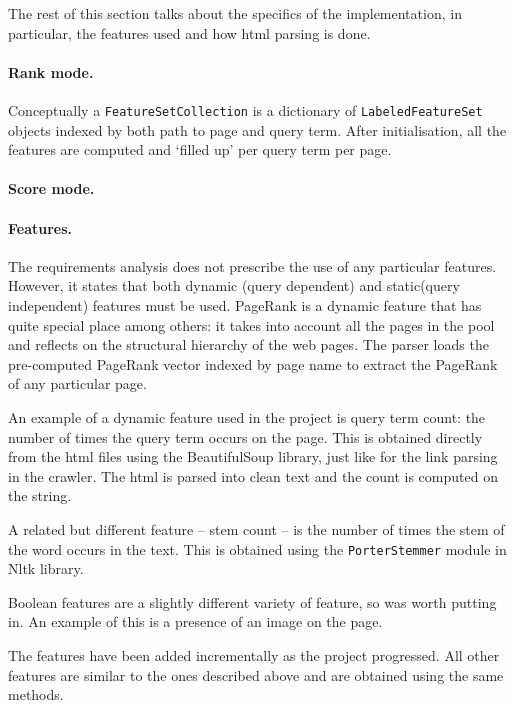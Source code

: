 \documentclass[11pt,twoside,notitlepage]{report}
\begin{document}
The rest of this section talks about the specifics of the implementation, in
particular, the features used and how html parsing is done.

\paragraph{Rank mode.}
Conceptually a \texttt{FeatureSetCollection} is a dictionary of \texttt{LabeledFeatureSet}
objects indexed by both path to page and  query term. After initialisation, all
the features are computed and `filled up' per query term per page.

\paragraph{Score mode.}
\paragraph{Features.}


The requirements analysis does not prescribe the use of any particular
features. However, it states that both dynamic (query dependent) and
static(query independent) features must be used. PageRank is a dynamic feature
that has quite special place among others: it takes into account all the pages
in the pool and reflects on the structural hierarchy of the web pages. 
The parser loads the pre-computed PageRank vector indexed by page name to
extract the PageRank of any particular page.

An example of a dynamic feature used in the project is query term count: the
number of times the query term occurs on the page. This is obtained directly
from the html files using the BeautifulSoup library, just like for the link
parsing in the crawler. The html is parsed into clean text and the count is
computed on the string.

A related but different feature -- stem count -- is the number of times the
stem of the word occurs in the text. This is obtained using the \texttt{PorterStemmer}
module in Nltk library.

Boolean features are a slightly different variety of feature, so was worth
putting in. An example of this is a presence of an image on the page.

The features have been added incrementally as the project progressed. All other
features are similar to the ones described above and are obtained using the
same methods.
\end{document}
